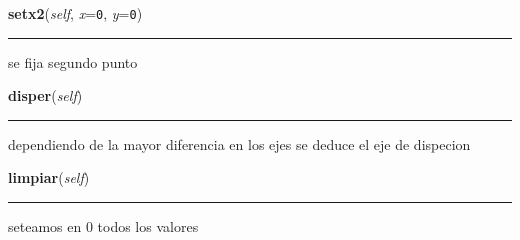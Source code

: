     \label{astroplot_s:dispes:setx2}

    \vspace{0.5ex}

\hspace{.8\funcindent}\begin{boxedminipage}{\funcwidth}

    \raggedright \textbf{setx2}(\textit{self}, \textit{x}={\tt 0}, \textit{y}={\tt 0})

    \vspace{-1.5ex}

    \rule{\textwidth}{0.5\fboxrule}
\setlength{\parskip}{2ex}
    se fija segundo punto

\setlength{\parskip}{1ex}
    \end{boxedminipage}

    \label{astroplot_s:dispes:disper}

    \vspace{0.5ex}

\hspace{.8\funcindent}\begin{boxedminipage}{\funcwidth}

    \raggedright \textbf{disper}(\textit{self})

    \vspace{-1.5ex}

    \rule{\textwidth}{0.5\fboxrule}
\setlength{\parskip}{2ex}
    dependiendo de la mayor diferencia en los ejes se deduce el eje de 
    dispecion

\setlength{\parskip}{1ex}
    \end{boxedminipage}

    \label{astroplot_s:dispes:limpiar}

    \vspace{0.5ex}

\hspace{.8\funcindent}\begin{boxedminipage}{\funcwidth}

    \raggedright \textbf{limpiar}(\textit{self})

    \vspace{-1.5ex}

    \rule{\textwidth}{0.5\fboxrule}
\setlength{\parskip}{2ex}
    seteamos en 0 todos los valores

\setlength{\parskip}{1ex}
    \end{boxedminipage}


